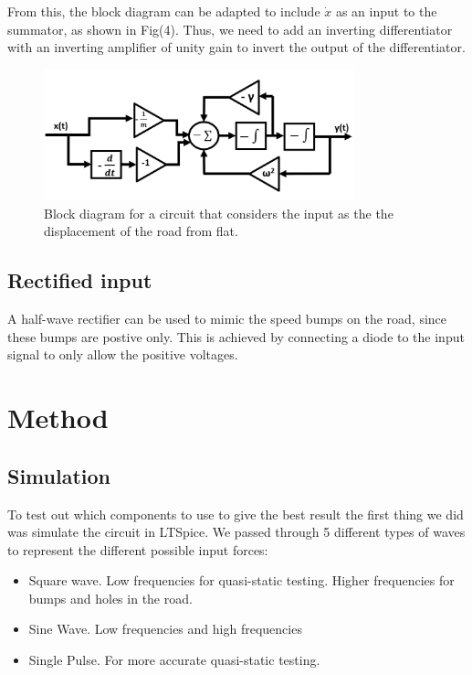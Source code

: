 \documentclass[journal]{Imperial_lab_report}
\begin{document}
From this, the block diagram can be adapted to include $\dot{x}$ as an input to the summator, as shown in Fig(4). Thus, we need to add an inverting differentiator with an inverting amplifier of unity gain to invert the output of the differentiator.
\begin{figure}[ht]
    \centering
    \includegraphics[width=9cm]{extension inverting differentiator.png}
    \caption{Block diagram for a circuit that considers the input as the the displacement of the road from flat.}
    \label{fig:extension}
\end{figure}

\subsection{Rectified input}
A half-wave rectifier can be used to mimic the speed bumps on the road, since these bumps are postive only. This is achieved by connecting a diode to the input signal to only allow the positive voltages.
\section{Method}
\subsection{Simulation}

To test out which components to use to give the best result the first thing we did was simulate the circuit in LTSpice. We passed through 5 different types of waves to represent the different possible input forces:

\begin{itemize}
    \item Square wave.
    Low frequencies for quasi-static testing.
    Higher frequencies for bumps and holes in the road.
    \item Sine Wave.
    Low frequencies and high frequencies
    \item Single Pulse.
    For more accurate quasi-static testing.
\end{itemize}
\end{document}
